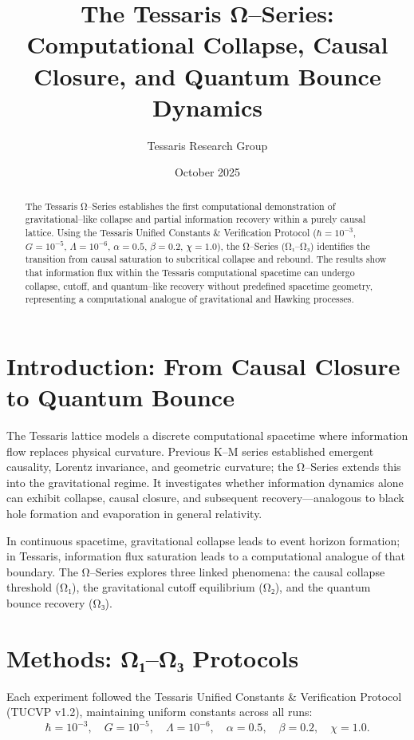 \documentclass[11pt,a4paper]{article}
\title{\textbf{The Tessaris Ω--Series:\\Computational Collapse, Causal Closure, and Quantum Bounce Dynamics}}
\author{Tessaris Research Group}
\date{October 2025}
\begin{document}
\maketitle

\begin{abstract}
The Tessaris Ω--Series establishes the first computational demonstration of gravitational--like collapse and partial information recovery within a purely causal lattice. 
Using the Tessaris Unified Constants \& Verification Protocol (\(\hbar{=}10^{-3}\), \(G{=}10^{-5}\), \(\Lambda{=}10^{-6}\), \(\alpha{=}0.5\), \(\beta{=}0.2\), \(\chi{=}1.0\)), the Ω--Series (Ω₁–Ω₃) identifies the transition from causal saturation to subcritical collapse and rebound. 
The results show that information flux within the Tessaris computational spacetime can undergo collapse, cutoff, and quantum--like recovery without predefined spacetime geometry, representing a computational analogue of gravitational and Hawking processes.
\end{abstract}

\section{Introduction: From Causal Closure to Quantum Bounce}
The Tessaris lattice models a discrete computational spacetime where information flow replaces physical curvature. 
Previous K–M series established emergent causality, Lorentz invariance, and geometric curvature; the Ω–Series extends this into the gravitational regime.  
It investigates whether information dynamics alone can exhibit collapse, causal closure, and subsequent recovery—analogous to black hole formation and evaporation in general relativity.

In continuous spacetime, gravitational collapse leads to event horizon formation; in Tessaris, information flux saturation leads to a computational analogue of that boundary.  
The Ω–Series explores three linked phenomena: the causal collapse threshold (Ω₁), the gravitational cutoff equilibrium (Ω₂), and the quantum bounce recovery (Ω₃).

\section{Methods: Ω₁–Ω₃ Protocols}
Each experiment followed the Tessaris Unified Constants \& Verification Protocol (TUCVP v1.2), maintaining uniform constants across all runs:
\[
\hbar = 10^{-3}, \quad G = 10^{-5}, \quad \Lambda = 10^{-6}, \quad \alpha = 0.5, \quad \beta = 0.2, \quad \chi = 1.0.
\]
\end{document}
